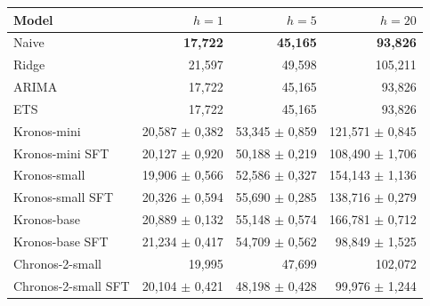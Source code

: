\begin{tabular}{@{}lrrr@{}}
\toprule
Model & $h=1$ & $h=5$ & $h=20$ \\
\midrule
Naive & \textbf{17,722} & \textbf{45,165} & \textbf{93,826} \\
Ridge & 21,597 & 49,598 & 105,211 \\
ARIMA & 17,722 & 45,165 & 93,826 \\
ETS & 17,722 & 45,165 & 93,826 \\
\midrule
Kronos-mini & 20,587 $\pm$ 0,382 & 53,345 $\pm$ 0,859 & 121,571 $\pm$ 0,845 \\
Kronos-mini SFT & 20,127 $\pm$ 0,920 & 50,188 $\pm$ 0,219 & 108,490 $\pm$ 1,706 \\
Kronos-small & 19,906 $\pm$ 0,566 & 52,586 $\pm$ 0,327 & 154,143 $\pm$ 1,136 \\
Kronos-small SFT & 20,326 $\pm$ 0,594 & 55,690 $\pm$ 0,285 & 138,716 $\pm$ 0,279 \\
Kronos-base & 20,889 $\pm$ 0,132 & 55,148 $\pm$ 0,574 & 166,781 $\pm$ 0,712 \\
Kronos-base SFT & 21,234 $\pm$ 0,417 & 54,709 $\pm$ 0,562 & 98,849 $\pm$ 1,525 \\
Chronos-2-small & 19,995 & 47,699 & 102,072 \\
Chronos-2-small SFT & 20,104 $\pm$ 0,421 & 48,198 $\pm$ 0,428 & 99,976 $\pm$ 1,244 \\
\bottomrule
\end{tabular}
